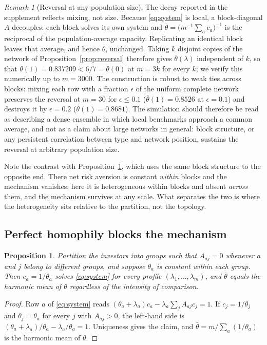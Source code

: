 \documentclass[12pt]{article}
\newtheorem{proposition}{Proposition}
\theoremstyle{definition}
\theoremstyle{remark}
\newtheorem{remark}{Remark}
\newcommand{\bth}{\bar\theta}
\begin{document}
\begin{remark}[Reversal at any population size]
\label{rem:blocks}
The decay reported in the supplement reflects mixing, not size. Because
\eqref{eq:system} is local, a block-diagonal $A$ decouples: each block solves
its own system and $\bth=\big(m^{-1}\sum_ac_a\big)^{-1}$ is the reciprocal of
the population-average capacity. Replicating an identical block leaves that
average, and hence $\bth$, unchanged. Taking $k$ disjoint copies of the network
of Proposition~\ref{prop:reversal} therefore gives $\bth(\lambda)$ independent
of $k$, so that $\bth(1)=0.837209<6/7=\bth(0)$ at $m=3k$ for every $k$; we verify
this numerically up to $m=3000$. The construction is robust to weak ties across
blocks: mixing each row with a fraction $\epsilon$ of the uniform complete
network preserves the reversal at $m=30$ for $\epsilon\leq0.1$
($\bth(1)=0.8526$ at $\epsilon=0.1$) and destroys it by $\epsilon=0.2$
($\bth(1)=0.8681$). The simulation should therefore be read as describing a
dense ensemble in which local benchmarks approach a common average, and not as
a claim about large networks in general: block structure, or any persistent
correlation between type and network position, sustains the reversal at
arbitrary population size.

Note the contrast with Proposition~\ref{prop:homophily}, which uses the same
block structure to the opposite end. There net risk aversion is constant
\emph{within} blocks and the mechanism vanishes; here it is heterogeneous
within blocks and absent \emph{across} them, and the mechanism survives at any
scale. What separates the two is where the heterogeneity sits relative to the
partition, not the topology.
\end{remark}

\subsection{Perfect homophily blocks the mechanism}

\begin{proposition}
\label{prop:homophily}
Partition the investors into groups such that $A_{aj}=0$ whenever $a$ and $j$
belong to different groups, and suppose $\theta_a$ is constant within each
group. Then $c_a=1/\theta_a$ solves \eqref{eq:system} for every profile
$(\lambda_1,\dots,\lambda_m)$, and $\bth$ equals the harmonic mean of $\theta$
regardless of the intensity of comparison.
\end{proposition}

\begin{proof}
Row $a$ of \eqref{eq:system} reads
$(\theta_a+\lambda_a)c_a-\lambda_a\sum_jA_{aj}c_j=1$. If $c_j=1/\theta_j$ and
$\theta_j=\theta_a$ for every $j$ with $A_{aj}>0$, the left-hand side is
$(\theta_a+\lambda_a)/\theta_a-\lambda_a/\theta_a=1$. Uniqueness gives the
claim, and $\bth=m/\sum_a(1/\theta_a)$ is the harmonic mean of $\theta$.
\end{proof}
\end{document}
